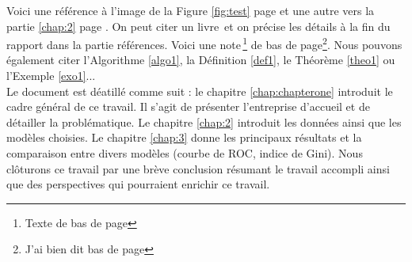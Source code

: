 

%
%


Voici une référence à l'image de la Figure \ref{fig:test} page \pageref{fig:test} et une autre vers la partie \ref{chap:2} page \pageref{chap:2}.
On peut citer un livre\, \cite{caillois1} et on précise les détails à la fin du rapport dans la partie références.
Voici une note\,\footnote{Texte de bas de page} de bas de page\footnote{J'ai bien dit bas de page}. Nous pouvons également citer l'Algorithme \ref{algo1}, la Définition \ref{def1}, le Théorème \ref{theo1} ou l'Exemple \ref{exo1}...\\

Le document est déatillé comme suit : le chapitre \ref{chap:chapterone} introduit le cadre général de ce travail. Il s'agit de présenter l'entreprise d'accueil et de détailler la problématique. Le chapitre \ref{chap:2} introduit les données ainsi que les modèles choisies. Le chapitre \ref{chap:3} donne les principaux résultats et la comparaison entre divers modèles (courbe de ROC, indice de Gini). Nous clôturons ce travail par une brève conclusion résumant le travail accompli ainsi que des perspectives qui pourraient enrichir ce travail.  


